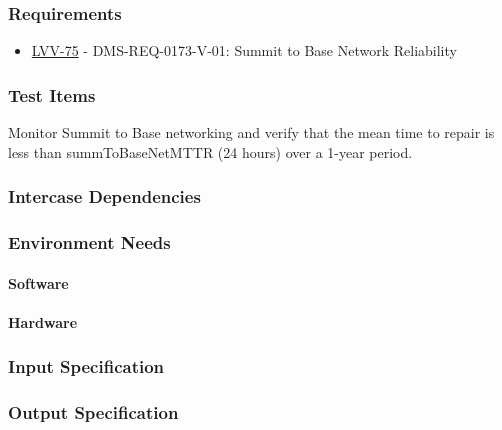 \subsubsection{Requirements}
\begin{itemize}
\item \href{https://jira.lsstcorp.org/browse/LVV-75}{LVV-75} - DMS-REQ-0173-V-01: Summit to Base Network Reliability
\end{itemize}

\subsubsection{Test Items}
Monitor Summit to Base networking and verify that the mean time to
repair is less than summToBaseNetMTTR (24 hours) over a 1-year period.



\subsubsection{Intercase Dependencies}

\subsubsection{Environment Needs}

\paragraph{Software}

\paragraph{Hardware}

\subsubsection{Input Specification}

\subsubsection{Output Specification}

